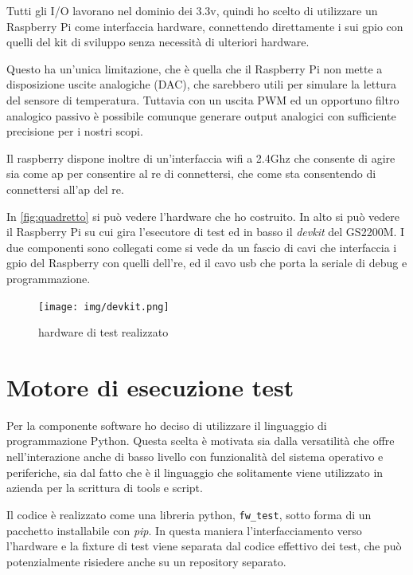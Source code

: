 \documentclass[12pt,a4paper,twoside,titlepage]{book}
\begin{document}
Tutti gli I/O lavorano nel dominio dei 3.3v, quindi ho scelto di utilizzare un
Raspberry Pi come interfaccia hardware, connettendo direttamente i sui \Gls{gpio} con
quelli del kit di sviluppo senza necessità di ulteriori hardware. 

Questo ha un'unica limitazione, che è quella che il Raspberry Pi non mette a disposizione
uscite analogiche (DAC), che sarebbero utili per simulare la lettura del sensore di
temperatura. Tuttavia con un uscita PWM ed un opportuno filtro analogico passivo è
possibile comunque generare output analogici con sufficiente precisione per i nostri scopi. 

Il raspberry dispone inoltre di un'interfaccia \Gls{wifi} a 2.4Ghz che consente di agire sia come 
\acrshort{ap} per consentire al \acrshort{re} di connettersi, che come \acrshort{sta} consentendo di 
connettersi all'\acrshort{ap} del \acrshort{re}.

In \autoref{fig:quadretto} si può vedere l'hardware che ho costruito. In alto si può 
vedere il Raspberry Pi su cui gira l'esecutore di test ed in basso il \textit{devkit} del GS2200M. 
I due componenti sono collegati come si vede da un fascio di cavi che interfaccia i \acrshort{gpio}
del Raspberry con quelli dell'\acrshort{re}, ed il cavo \acrshort{usb} che porta la seriale di debug
e programmazione. 

\begin{figure}
    \centering
    \texttt{[image: img/devkit.png]}
    \caption{hardware di test realizzato}
    \label{fig:quadretto}
\end{figure}

\section{Motore di esecuzione test}

Per la componente software ho deciso di utilizzare il linguaggio di programmazione
Python. Questa scelta è motivata sia dalla versatilità che offre nell'interazione anche
di basso livello con funzionalità del sistema operativo e periferiche, sia dal fatto
che è il linguaggio che solitamente viene utilizzato in azienda per la scrittura di
tools e script.

Il codice è realizzato come una libreria python, \texttt{fw\_test}, sotto forma di
un pacchetto installabile con \textit{pip}. In questa maniera l'interfacciamento
verso l'hardware e la fixture di test viene separata dal codice effettivo dei test,
che può potenzialmente risiedere anche su un repository separato.
\end{document}
